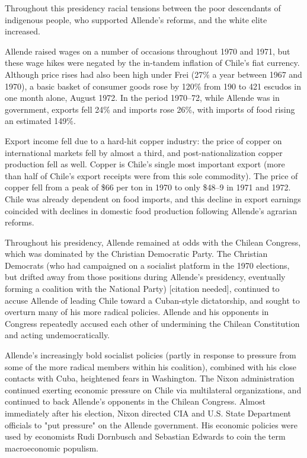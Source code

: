 Throughout this presidency racial tensions between the poor descendants
of indigenous people, who supported Allende's reforms, and the white
elite increased.

Allende raised wages on a number of occasions throughout 1970 and 1971,
but these wage hikes were negated by the in-tandem inflation of Chile's
fiat currency. Although price rises had also been high under Frei (27\%
a year between 1967 and 1970), a basic basket of consumer goods rose by
120\% from 190 to 421 escudos in one month alone, August 1972. In the
period 1970--72, while Allende was in government, exports fell 24\% and
imports rose 26\%, with imports of food rising an estimated 149\%.

Export income fell due to a hard-hit copper industry: the price of
copper on international markets fell by almost a third, and
post-nationalization copper production fell as well. Copper is Chile's
single most important export (more than half of Chile's export receipts
were from this sole commodity). The price of copper fell from a peak of
\$66 per ton in 1970 to only \$48--9 in 1971 and 1972. Chile was already
dependent on food imports, and this decline in export earnings coincided
with declines in domestic food production following Allende's agrarian
reforms.

Throughout his presidency, Allende remained at odds with the Chilean
Congress, which was dominated by the Christian Democratic Party. The
Christian Democrats (who had campaigned on a socialist platform in the
1970 elections, but drifted away from those positions during Allende's
presidency, eventually forming a coalition with the National Party)
{[}citation needed{]}, continued to accuse Allende of leading Chile
toward a Cuban-style dictatorship, and sought to overturn many of his
more radical policies. Allende and his opponents in Congress repeatedly
accused each other of undermining the Chilean Constitution and acting
undemocratically.

Allende's increasingly bold socialist policies (partly in response to
pressure from some of the more radical members within his coalition),
combined with his close contacts with Cuba, heightened fears in
Washington. The Nixon administration continued exerting economic
pressure on Chile via multilateral organizations, and continued to back
Allende's opponents in the Chilean Congress. Almost immediately after
his election, Nixon directed CIA and U.S. State Department officials to
"put pressure" on the Allende government. His economic policies were
used by economists Rudi Dornbusch and Sebastian Edwards to coin the term
macroeconomic populism.

